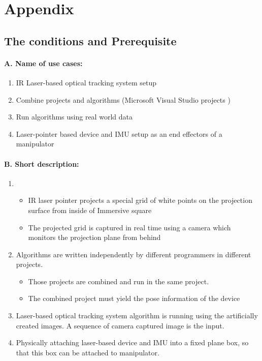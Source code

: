 \section{Appendix}

\subsection{The conditions and Prerequisite} \label{prerequisite}

\paragraph{A.	Name of use cases:}
\begin{enumerate}
	\item IR Laser-based optical tracking system setup
	\item Combine projects and algorithms  (Microsoft Visual Studio projects )
	\item Run algorithms using real world data
	\item Laser-pointer based device and IMU setup as an end effectors of a manipulator
\end{enumerate}
\paragraph{B.	Short description:}
\begin{enumerate}
	\item 	 
		\begin{itemize}
		\item IR laser pointer projects a special grid of white points on the projection surface from inside of Immersive square
		\item The projected grid is captured in real time using a camera which monitors the projection plane from behind
		\end{itemize}
	\item Algorithms are written independently by different programmers in different projects. 
		\begin{itemize}
		\item Those projects are combined and run in the same project.  
		\item	The combined project must yield the pose information of the device
		\end{itemize}
	\item Laser-based optical tracking system algorithm is running using the artificially created images. A sequence of camera captured image is the input.  
\item Physically attaching laser-based device and IMU into a fixed plane box, so that this box can be attached to manipulator.
\end{enumerate}
 
